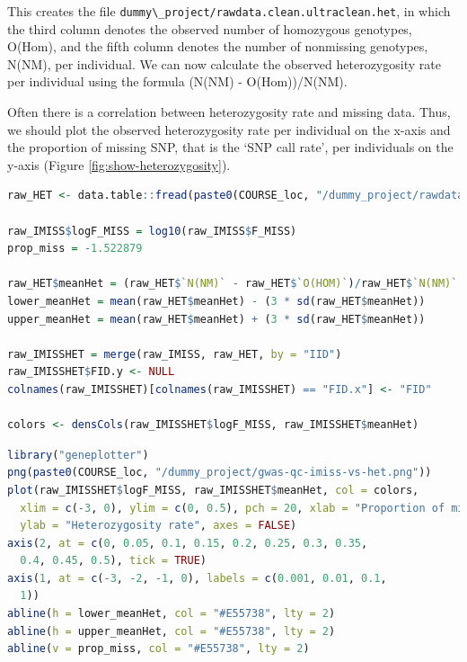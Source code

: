 \documentclass[
]{book}
\newcommand{\passthrough}[1]{#1}
\begin{document}
This creates the file \passthrough{\lstinline!dummy\_project/rawdata.clean.ultraclean.het!}, in which the third column denotes the observed number of homozygous genotypes, O(Hom), and the fifth column denotes the number of nonmissing genotypes, N(NM), per individual. We can now calculate the observed heterozygosity rate per individual using the formula (N(NM) - O(Hom))/N(NM).

Often there is a correlation between heterozygosity rate and missing data. Thus, we should plot the observed heterozygosity rate per individual on the x-axis and the proportion of missing SNP, that is the `SNP call rate', per individuals on the y-axis (Figure \ref{fig:show-heterozygosity}).

\begin{lstlisting}[language=R]
raw_HET <- data.table::fread(paste0(COURSE_loc, "/dummy_project/rawdata.clean.ultraclean.het"))

raw_IMISS$logF_MISS = log10(raw_IMISS$F_MISS)
prop_miss = -1.522879

raw_HET$meanHet = (raw_HET$`N(NM)` - raw_HET$`O(HOM)`)/raw_HET$`N(NM)`
lower_meanHet = mean(raw_HET$meanHet) - (3 * sd(raw_HET$meanHet))
upper_meanHet = mean(raw_HET$meanHet) + (3 * sd(raw_HET$meanHet))

raw_IMISSHET = merge(raw_IMISS, raw_HET, by = "IID")
raw_IMISSHET$FID.y <- NULL
colnames(raw_IMISSHET)[colnames(raw_IMISSHET) == "FID.x"] <- "FID"

colors <- densCols(raw_IMISSHET$logF_MISS, raw_IMISSHET$meanHet)
\end{lstlisting}

\begin{lstlisting}[language=R]
library("geneplotter")
png(paste0(COURSE_loc, "/dummy_project/gwas-qc-imiss-vs-het.png"))
plot(raw_IMISSHET$logF_MISS, raw_IMISSHET$meanHet, col = colors,
  xlim = c(-3, 0), ylim = c(0, 0.5), pch = 20, xlab = "Proportion of missing genotypes",
  ylab = "Heterozygosity rate", axes = FALSE)
axis(2, at = c(0, 0.05, 0.1, 0.15, 0.2, 0.25, 0.3, 0.35,
  0.4, 0.45, 0.5), tick = TRUE)
axis(1, at = c(-3, -2, -1, 0), labels = c(0.001, 0.01, 0.1,
  1))
abline(h = lower_meanHet, col = "#E55738", lty = 2)
abline(h = upper_meanHet, col = "#E55738", lty = 2)
abline(v = prop_miss, col = "#E55738", lty = 2)
\end{lstlisting}
\end{document}
